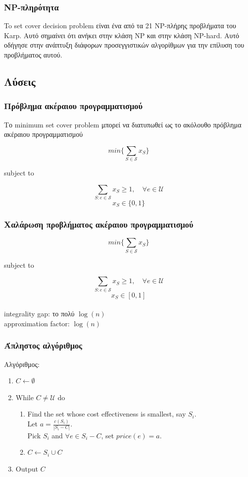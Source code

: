 \documentclass[greek]{beamer}
\begin{document}

\begin{frame}
\frametitle{NP-πληρότητα}
To set cover decision problem είναι ένα από τα 21 NP-πλήρης προβλήματα του Karp. Αυτό σημαίνει ότι ανήκει στην κλάση NP και στην κλάση NP-hard. Αυτό οδήγησε στην ανάπτυξη διάφορων προσεγγιστικών αλγορίθμων για την επίλυση του προβλήματος αυτού.
\end{frame}


\subsection{Λύσεις}


\begin{frame}
\frametitle{Πρόβλημα ακέραιου προγραμματισμού}
Το minimum set cover problem μπορεί να διατυπωθεί ως το ακόλουθο πρόβλημα ακέραιου προγραμματισμού

$$min\{\displaystyle\sum_{S\in{\mathcal{S}}} x_S\}$$ 
\centerline{subject to}
$$\displaystyle\sum_{S:e\in{\mathcal{S}}} x_S \geq{1}, \quad \forall e \in{\mathcal{U}}$$
$$ x_S \in{\{0, 1\}}$$
\end{frame}


\begin{frame}
\frametitle{Χαλάρωση προβλήματος ακέραιου προγραμματισμού}
$$min\{\displaystyle\sum_{S\in{\mathcal{S}}} x_S\}$$ 
\centerline{subject to}
$$\displaystyle\sum_{S:e\in{\mathcal{S}}} x_S \geq{1}, \quad \forall e \in{\mathcal{U}}$$
$$ x_S \in{[0, 1]}$$\\

integrality gap: το πολύ $\log(n)$\\
approximation factor: $\log(n)$
\end{frame}


\begin{frame}
\frametitle{Άπληστος αλγόριθμος}
Αλγόριθμος:
\begin{enumerate}
\item $ C \leftarrow \emptyset$
\item While $ C \neq {\mathcal{U}} $ do
\begin{enumerate}
\item Find the set whose cost effectiveness is smallest, say $S_i$. \\
			Let $a = \frac{c(S_i)}{|S_i-C|}$. \\
			Pick $S_i$ and $\forall e \in{S_i - C}$, set $price(e) = a$.
\item $C \leftarrow S_i \cup C$
\end{enumerate}
\item Output $C$
\end{enumerate}
\end{frame}
\end{document}

